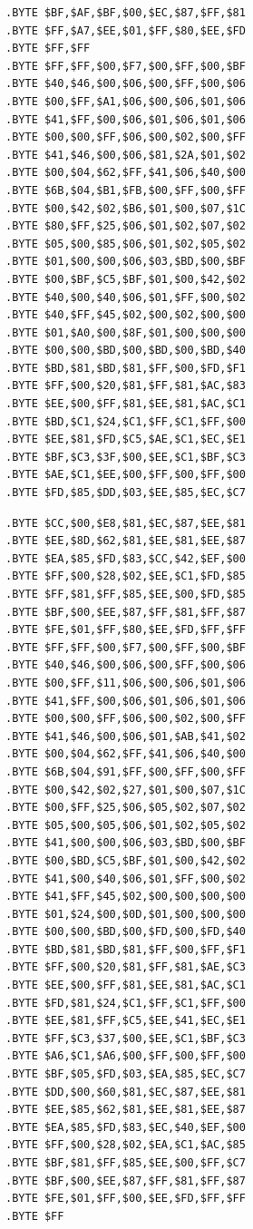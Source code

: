 \begin{minipage}[b]{0.33\linewidth}
\begin{lrbox}{\mybox}
\begin{lstlisting}[basicstyle=\ttfamily\tiny]
.BYTE $BF,$AF,$BF,$00,$EC,$87,$FF,$81
.BYTE $FF,$A7,$EE,$01,$FF,$80,$EE,$FD
.BYTE $FF,$FF
.BYTE $FF,$FF,$00,$F7,$00,$FF,$00,$BF
.BYTE $40,$46,$00,$06,$00,$FF,$00,$06
.BYTE $00,$FF,$A1,$06,$00,$06,$01,$06
.BYTE $41,$FF,$00,$06,$01,$06,$01,$06
.BYTE $00,$00,$FF,$06,$00,$02,$00,$FF
.BYTE $41,$46,$00,$06,$81,$2A,$01,$02
.BYTE $00,$04,$62,$FF,$41,$06,$40,$00
.BYTE $6B,$04,$B1,$FB,$00,$FF,$00,$FF
.BYTE $00,$42,$02,$B6,$01,$00,$07,$1C
.BYTE $80,$FF,$25,$06,$01,$02,$07,$02
.BYTE $05,$00,$85,$06,$01,$02,$05,$02
.BYTE $01,$00,$00,$06,$03,$BD,$00,$BF
.BYTE $00,$BF,$C5,$BF,$01,$00,$42,$02
.BYTE $40,$00,$40,$06,$01,$FF,$00,$02
.BYTE $40,$FF,$45,$02,$00,$02,$00,$00
.BYTE $01,$A0,$00,$8F,$01,$00,$00,$00
.BYTE $00,$00,$BD,$00,$BD,$00,$BD,$40
.BYTE $BD,$81,$BD,$81,$FF,$00,$FD,$F1
.BYTE $FF,$00,$20,$81,$FF,$81,$AC,$83
.BYTE $EE,$00,$FF,$81,$EE,$81,$AC,$C1
.BYTE $BD,$C1,$24,$C1,$FF,$C1,$FF,$00
.BYTE $EE,$81,$FD,$C5,$AE,$C1,$EC,$E1
.BYTE $BF,$C3,$3F,$00,$EE,$C1,$BF,$C3
.BYTE $AE,$C1,$EE,$00,$FF,$00,$FF,$00
.BYTE $FD,$85,$DD,$03,$EE,$85,$EC,$C7
\end{lstlisting}
\end{lrbox}%
\scalebox{0.8}{\usebox{\mybox}}
\end{minipage}
\begin{minipage}[b]{0.33\linewidth}
\begin{lrbox}{\mybox}%
\begin{lstlisting}[basicstyle=\ttfamily\tiny]
.BYTE $CC,$00,$E8,$81,$EC,$87,$EE,$81
.BYTE $EE,$8D,$62,$81,$EE,$81,$EE,$87
.BYTE $EA,$85,$FD,$83,$CC,$42,$EF,$00
.BYTE $FF,$00,$28,$02,$EE,$C1,$FD,$85
.BYTE $FF,$81,$FF,$85,$EE,$00,$FD,$85
.BYTE $BF,$00,$EE,$87,$FF,$81,$FF,$87
.BYTE $FE,$01,$FF,$80,$EE,$FD,$FF,$FF
.BYTE $FF,$FF,$00,$F7,$00,$FF,$00,$BF
.BYTE $40,$46,$00,$06,$00,$FF,$00,$06
.BYTE $00,$FF,$11,$06,$00,$06,$01,$06
.BYTE $41,$FF,$00,$06,$01,$06,$01,$06
.BYTE $00,$00,$FF,$06,$00,$02,$00,$FF
.BYTE $41,$46,$00,$06,$01,$AB,$41,$02
.BYTE $00,$04,$62,$FF,$41,$06,$40,$00
.BYTE $6B,$04,$91,$FF,$00,$FF,$00,$FF
.BYTE $00,$42,$02,$27,$01,$00,$07,$1C
.BYTE $00,$FF,$25,$06,$05,$02,$07,$02
.BYTE $05,$00,$05,$06,$01,$02,$05,$02
.BYTE $41,$00,$00,$06,$03,$BD,$00,$BF
.BYTE $00,$BD,$C5,$BF,$01,$00,$42,$02
.BYTE $41,$00,$40,$06,$01,$FF,$00,$02
.BYTE $41,$FF,$45,$02,$00,$00,$00,$00
.BYTE $01,$24,$00,$0D,$01,$00,$00,$00
.BYTE $00,$00,$BD,$00,$FD,$00,$FD,$40
.BYTE $BD,$81,$BD,$81,$FF,$00,$FF,$F1
.BYTE $FF,$00,$20,$81,$FF,$81,$AE,$C3
.BYTE $EE,$00,$FF,$81,$EE,$81,$AC,$C1
.BYTE $FD,$81,$24,$C1,$FF,$C1,$FF,$00
.BYTE $EE,$81,$FF,$C5,$EE,$41,$EC,$E1
.BYTE $FF,$C3,$37,$00,$EE,$C1,$BF,$C3
.BYTE $A6,$C1,$A6,$00,$FF,$00,$FF,$00
.BYTE $BF,$05,$FD,$03,$EA,$85,$EC,$C7
.BYTE $DD,$00,$60,$81,$EC,$87,$EE,$81
.BYTE $EE,$85,$62,$81,$EE,$81,$EE,$87
.BYTE $EA,$85,$FD,$83,$EC,$40,$EF,$00
.BYTE $FF,$00,$28,$02,$EA,$C1,$AC,$85
.BYTE $BF,$81,$FF,$85,$EE,$00,$FF,$C7
.BYTE $BF,$00,$EE,$87,$FF,$81,$FF,$87
.BYTE $FE,$01,$FF,$00,$EE,$FD,$FF,$FF
.BYTE $FF

\end{lstlisting}
\end{lrbox}%
\scalebox{0.8}{\usebox{\mybox}}
\end{minipage}
